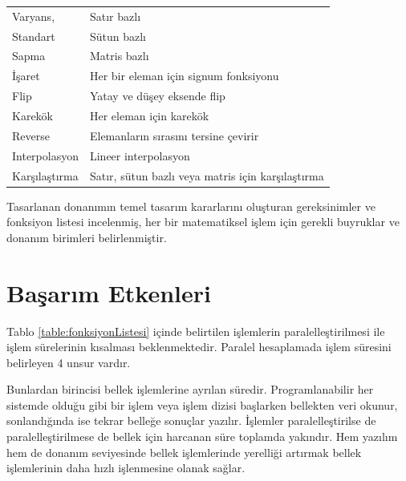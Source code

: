 \begin{longtable}{p{80pt} p{250pt}}
 Varyans,								& Satır bazlı 	 																							\\%
 Standart 					& Sütun bazlı 	 																							\\%
 Sapma												& Matris bazlı 	 																							\\%
 İşaret									& Her bir eleman için signum fonksiyonu 											\\%
 Flip										& Yatay ve düşey eksende flip 																\\%
 Karekök 								& Her eleman için karekök 																		\\%
 Reverse 								& Elemanların sırasını tersine çevirir 												\\%
 Interpolasyon 					& Lineer interpolasyon 																				\\%
 Karşılaştırma 					& Satır, sütun bazlı veya matris için karşılaştırma 					\\%
\end{longtable}

Tasarlanan donanımın temel tasarım kararlarını oluşturan gereksinimler ve fonksiyon listesi incelenmiş, her bir matematiksel işlem için gerekli buyruklar ve donanım birimleri belirlenmiştir. 


\section{Başarım Etkenleri}\label{basarimEtkenleri}
Tablo \ref{table:fonksiyonListesi} içinde belirtilen işlemlerin paralelleştirilmesi ile işlem sürelerinin kısalması beklenmektedir. Paralel hesaplamada işlem süresini belirleyen 4 unsur vardır. \par

Bunlardan birincisi bellek işlemlerine ayrılan süredir. Programlanabilir her sistemde olduğu gibi bir işlem veya işlem dizisi başlarken bellekten veri okunur, sonlandığında ise tekrar belleğe sonuçlar yazılır. İşlemler paralelleştirilse de paralelleştirilmese de bellek için harcanan süre toplamda yakındır. Hem yazılım hem de donanım seviyesinde bellek işlemlerinde yerelliği artırmak bellek işlemlerinin daha hızlı işlenmesine olanak sağlar.\par

